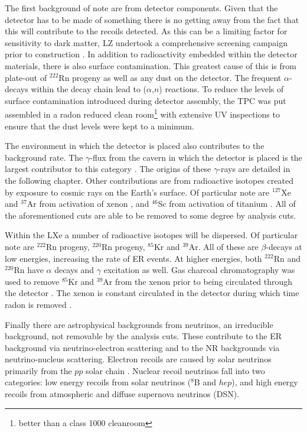 \par
The first background of note are from detector components.
Given that the detector has to be made of something there is no getting away from the fact that this will contribute to the recoils detected.
As this can be a limiting factor for sensitivity to dark matter, LZ undertook a comprehensive screening campaign prior to construction \cite{LZ_assay_ref}.
In addition to radioactivity embedded within the detector materials, there is also surface contamination.
This greatest cause of this is from plate-out of ${}^{222}$Rn progeny as well as any dust on the detector.
The frequent $\alpha$-decays within the decay chain lead to ($\alpha$,$n$) reactions.
To reduce the levels of surface contamination introduced during detector assembly, the TPC was put assembled in a radon reduced clean room\footnote{better than a class 1000 cleanroom} with extensive UV inspections to ensure that the dust levels were kept to a minimum.

\par
The environment in which the detector is placed also contributes to the background rate.
The $\gamma$-flux from the cavern in which the detector is placed is the largest contributor to this category \cite{LZ_Gamma_Ray_Background_ref}.
The origins of these $\gamma$-rays are detailed in the following chapter.
Other contributions are from radioactive isotopes created by exposure to cosmic rays on the Earth's surface.
Of particular note are $^{127}$Xe and ${}^{37}$Ar from activation of xenon \cite{lux_xenon_activation_ref,lz_argon37_ref}, and $^{46}$Sc from activation of titanium \cite{LZ_TechnicalDesignReview_ref}.
All of the aforementioned cuts are able to be removed to some degree by analysis cuts.

\par
Within the LXe a number of radioactive isotopes will be dispersed.
Of particular note are $^{222}$Rn progeny, $^{220}$Rn progeny, $^{85}$Kr and $^{39}$Ar.
All of these are $\beta$-decays at low energies, increasing the rate of ER events.
At higher energies, both $^{222}$Rn and $^{220}$Rn have $\alpha$ decays and $\gamma$ excitation as well.
Gas charcoal chromatography was used to remove $^{85}$Kr and $^{39}$Ar from the xenon prior to being circulated through the detector \cite{xenon_prufication_chromatography_ref}.
The xenon is constant circulated in the detector during which time radon is removed \cite{marisarthurs_thesis_ref}.

\par
Finally there are astrophysical backgrounds from neutrinos, an irreducible background, not removable by the analysis cuts.
These contribute to the ER background via neutrino-electron scattering and to the NR backgrounds via neutrino-nucleus scattering.
Electron recoils are caused by solar neutrinos primarily from the $pp$ solar chain \cite{solar_neutrinos_ref}.
Nuclear recoil neutrinos fall into two categories: low energy recoils from solar neutrinos ($^{8}$B and $hep$), and high energy recoils from atmospheric and diffuse supernova neutrinos (DSN).

